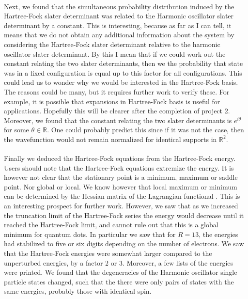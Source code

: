\documentclass[11pt,english,a4paper]{article}
\begin{document}
\\
Next, we found that the simultaneous probability distribution induced by the Hartree-Fock slater determinant was related to the Harmonic oscillator slater determinant by a constant. This is interesting, because as far as I can tell, it means that we do not obtain any additional information about the system by considering the Hartree-Fock slater determinant relative to the harmonic oscillator slater determinant. By this I mean that if we could work out the constant relating the two slater determinants, then we the probability that state was in a fixed configuration is equal up to this factor for all configurations. This could lead us to wonder why we would be interested in the Hartree-Fock basis. The reasons could be many, but it requires further work to verify these. For example, it is possible that expansions in Hartree-Fock basis is useful for applications. Hopefully this will be clearer after the completion of project 2. Moreover, we found that the constant relating the two slater determinants is $e^{ i \theta}$ for some $\theta \in \mathbb{R}$. One could probably predict this since if it was not the case, then the wavefunction would not remain normalized for identical supports in $\mathbb{R}^2$.\\
\\
Finally we deduced the Hartree-Fock equations from the Hartree-Fock energy. Users should note that the Hartree-Fock equations extremize the energy. It is however not clear that the stationary point is a minimum, maximum or saddle point. Nor global or local. We know however that local maximum or minimum can be determined by the Hessian matrix of the Lagrangian functional \parencite[383]{lindstrom_flervariabel_2011}. This is an interesting prospect for further work. However, we saw that as we increased the truncation limit of the Hartree-Fock series the energy would decrease until it reached the Hartree-Fock limit, and cannot rule out that this is a global minimum for quantum dots. In particular we saw that for $R=13$, the energies had stabilized to five or six digits depending on the number of electrons. We saw that the Hartree-Fock energies were somewhat larger compared to the unperturbed energies, by a factor 2 or 3. Moreover, a few lists of the energies were printed. We found that the degeneracies of the Harmonic oscillator single particle states changed, such that the there were only pairs of states with the same energies, probably those with identical spin.
\end{document}
